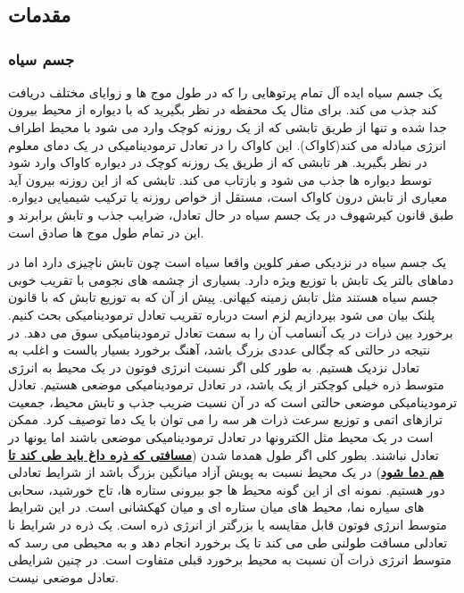 \documentclass{report}
\begin{document}
\part*{}

\tableofcontents

\chapter{مقدمات}
\section{جسم سیاه}
یک جسم سیاه  ایده آل تمام پرتوهایی را که در طول موج ها و زوایای مختلف دریافت کند جذب می کند. برای
مثال یک محفظه در نظر بگیرید که با دیواره از محیط بیرون جدا شده و تنها از طریق تابشی که از یک روزنه
کوچک وارد می شود با محیط اطراف انرژی مبادله می کند(کاواک). این کاواک را در تعادل ترمودینامیکی در
یک دمای معلوم در نظر بگیرید. هر تابشی که از طریق یک روزنه کوچک در دیواره کاواک وارد شود توسط
دیواره ها جذب می شود و بازتاب می کند. تابشی که از این روزنه بیرون آید معیاری از تابش درون کاواک
است، مستقل از خواص روزنه یا ترکیب شیمیایی دیواره. طبق قانون کیرشهوف در یک جسم سیاه در حال
تعادل، ضرایب جذب و تابش برابرند و این در تمام طول موج ها صادق است. \cite{birney2006observational}

یک جسم سیاه در نزدیکی صفر کلوین واقعا سیاه است چون تابش ناچیزی دارد اما در دماهای بالتر یک تابش
با توزیع ویژه دارد. بسیاری از چشمه های نجومی با تقریب خوبی جسم سیاه هستند مثل تابش زمینه کیهانی.
پیش از آن که به توزیع تابش که با قانون پلنک بیان می شود بپردازیم لزم است درباره تقریب تعادل
ترمودینامیکی بحث کنیم. برخورد بین ذرات در یک آنسامب آن را به سمت تعادل ترمودینامیکی سوق می دهد.
در نتیجه در حالتی که چگالی عددی بزرگ باشد، آهنگ برخورد بسیار بالست و اغلب به تعادل نزدیک هستیم.
به طور کلی اگر نسبت انرژی فوتون در یک محیط به انرژی متوسط ذره خیلی کوچکتر از یک باشد، در تعادل
ترمودینامیکی موضعی
 هستیم. تعادل ترمودینامیکی موضعی حالتی است که در آن نسبت ضریب جذب و
تابش محیط، جمعیت ترازهای اتمی و توزیع سرعت ذرات هر سه را می توان با یک دما توصیف کرد. ممکن
است در یک محیط مثل الکترونها در تعادل ترمودینامیکی موضعی  باشند اما یونها در تعادل نباشند. بطور کلی
 اگر طول همدما شدن
 (\textbf{\underline{مسافتی که ذره داغ باید طی کند تا هم دما شود}}) در یک محیط نسبت به پویش آزاد
میانگین بزرگ باشد از شرایط تعادلی دور هستیم. نمونه ای از این گونه محیط ها جو بیرونی ستاره ها، تاج
خورشید، سحابی های سیاره نما، محیط های میان ستاره ای و میان کهکشانی است. در این شرایط متوسط
انرژی فوتون قابل مقایسه یا بزرگتر از انرژی ذره است. یک ذره در شرایط نا تعادلی مسافت طولنی طی
می کند تا یک برخورد انجام دهد و به محیطی می رسد که متوسط انرژی ذرات آن نسبت به محیط برخورد
قبلی متفاوت است. در چنین شرایطی تعادل موضعی نیست. \cite{leblanc2011introduction, chandrasekhar1957introduction, carroll2007introduction}
\end{document}
